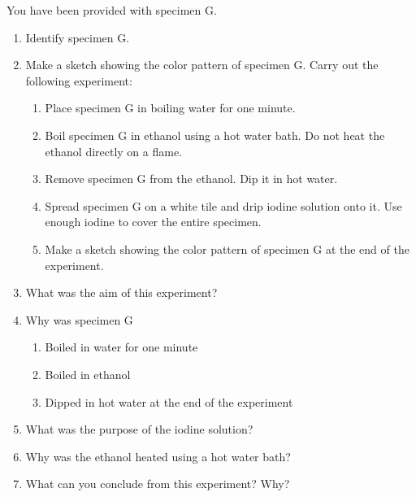 You have been provided with specimen G. 
\begin{enumerate}
\item{Identify specimen G.}
\item{Make a sketch showing the color pattern of specimen G.}
Carry out the following experiment:
\begin{enumerate}
\item{Place specimen G in boiling water for one minute.} 
\item{Boil specimen G in ethanol using a hot water bath. Do not heat the ethanol directly on a flame.}
\item{Remove specimen G from the ethanol. Dip it in hot water.}
\item{Spread specimen G on a white tile and drip iodine solution onto it. Use enough iodine to cover the entire specimen.}
\item{Make a sketch showing the color pattern of specimen G at the end of the experiment.}
\end{enumerate}
\item{What was the aim of this experiment?}
\item{Why was specimen G}
\begin{enumerate}
\item{Boiled in water for one minute}
\item{Boiled in ethanol}
\item{Dipped in hot water at the end of the experiment}
\end{enumerate}
\item{What was the purpose of the iodine solution?}
\item{Why was the ethanol heated using a hot water bath?}
\item{What can you conclude from this experiment? Why?}
\end{enumerate}
	 
